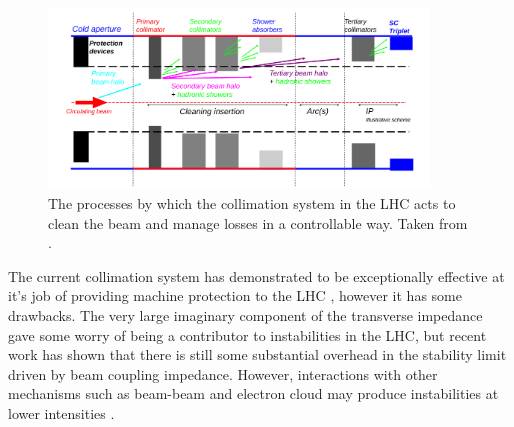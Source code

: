 \begin{figure}
\begin{center}
\includegraphics[width=0.9\textwidth]{LHC_Collimation_Upgrades/figures/collimationSchematic.pdf}
\end{center}
\caption{The processes by which the collimation system in the LHC acts to clean the beam and manage losses in a controllable way. Taken from \cite{Radaelli:ColFormat}.}
\label{fig:colSystemLayout}
\end{figure}

The current collimation system has demonstrated to be exceptionally effective at it's job of providing machine protection to the LHC \cite{Zerlauth:MP}, however it has some drawbacks. The very large imaginary component of the transverse impedance gave some worry of being a contributor to instabilities in the LHC, but recent work has shown that there is still some substantial overhead in the stability limit driven by beam coupling impedance. However, interactions with other mechanisms such as beam-beam and electron cloud may produce instabilities at lower intensities \cite{Mounet:PhDThesis}. 

